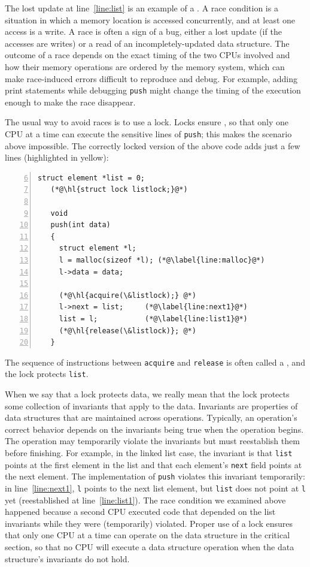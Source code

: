 The lost update at line~\ref{line:list} is an example of a
.
A race condition is a situation in which a memory location is accessed
concurrently, and at least one access is a write.
A race is often a sign of a bug, either a lost update
(if the accesses are writes) or a read of
an incompletely-updated data structure.
The outcome of a race depends on
the exact timing of the two CPUs involved and
how their memory operations are ordered by the memory system,
which can make race-induced errors difficult to reproduce
and debug.
For example, adding print statements while debugging
\lstinline{push}
might change the timing of the execution enough
to make the race disappear.

The usual way to avoid races is to use a lock.
Locks ensure
,
so that only one CPU at a time can execute 
the sensitive lines of
\lstinline{push};
this makes the scenario above impossible.
The correctly locked version of the above code
adds just a few lines (highlighted in yellow):
\begin{lstlisting}[numbers=left,firstnumber=6]
   struct element *list = 0;
   (*@\hl{struct lock listlock;}@*)
    	
   void
   push(int data)
   {
     struct element *l;
     l = malloc(sizeof *l); (*@\label{line:malloc}@*)
     l->data = data;
   
     (*@\hl{acquire(\&listlock);} @*)
     l->next = list;     (*@\label{line:next1}@*)
     list = l;           (*@\label{line:list1}@*)
     (*@\hl{release(\&listlock)}; @*)
   }
\end{lstlisting}
The sequence of instructions between
\lstinline{acquire}
and
\lstinline{release}
is often called a
,
and the lock protects
\lstinline{list}.

When we say that a lock protects data, we really mean
that the lock protects some collection of invariants
that apply to the data.
Invariants are properties of data structures that
are maintained across operations.
Typically, an operation's correct behavior depends
on the invariants being true when the operation
begins.  The operation may temporarily violate
the invariants but must reestablish them before
finishing.
For example, in the linked list case, the invariant is that
\lstinline{list}
points at the first element in the list
and that each element's
\lstinline{next}
field points at the next element.
The implementation of
\lstinline{push}
violates this invariant temporarily: in line~\ref{line:next1},
\lstinline{l}
points
to the next list element, but
\lstinline{list}
does not point at
\lstinline{l}
yet (reestablished at line~\ref{line:list1}).
The race condition we examined above
happened because a second CPU executed
code that depended on the list invariants
while they were (temporarily) violated.
Proper use of a lock ensures that only one CPU at a time
can operate on the data structure in the critical section, so that
no CPU will execute a data structure operation when the 
data structure's invariants do not hold.

